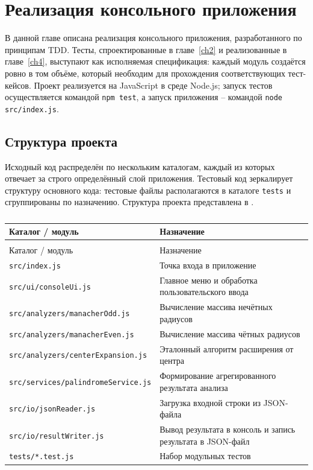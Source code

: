 \chapter{Реализация консольного приложения} \label{ch5}

В данной главе описана реализация консольного приложения, разработанного по принципам TDD.
Тесты, спроектированные в главе~\ref{ch2} и реализованные в главе~\ref{ch4}, выступают как исполняемая спецификация: каждый модуль создаётся ровно в том объёме, который необходим для прохождения соответствующих тест-кейсов.
Проект реализуется на JavaScript в среде Node.js; запуск тестов осуществляется командой \texttt{npm test}, а запуск приложения -- командой \texttt{node src/index.js}.

\section{Структура проекта} \label{ch5:sec1}

Исходный код распределён по нескольким каталогам, каждый из которых отвечает за строго определённый слой приложения.
Тестовый код зеркалирует структуру основного кода: тестовые файлы располагаются в каталоге \texttt{tests} и сгруппированы по назначению.
Структура проекта представлена в .

\noindent
\begingroup
\centering
\small
\begin{longtable}[c]{|p{7.8cm}|p{8.2cm}|}
    \caption{Структура проекта}
    \label{tab:packages}
    \\
    \hline
    Каталог / модуль & Назначение \\ \hline
    \endfirsthead
    \captionsetup{format=tablenocaption,labelformat=continued}
    \caption[]{}\\
    \hline
    Каталог / модуль & Назначение \\ \hline
    \endhead
    \hline
    \endfoot
    \hline
    \endlastfoot
    \texttt{src/index.js} & Точка входа в приложение \\ \hline
    \texttt{src/ui/consoleUi.js} & Главное меню и обработка пользовательского ввода \\ \hline
    \texttt{src/analyzers/manacherOdd.js} & Вычисление массива нечётных радиусов \\ \hline
    \texttt{src/analyzers/manacherEven.js} & Вычисление массива чётных радиусов \\ \hline
    \texttt{src/analyzers/centerExpansion.js} & Эталонный алгоритм расширения от центра \\ \hline
    \texttt{src/services/palindromeService.js} & Формирование агрегированного результата анализа \\ \hline
    \texttt{src/io/jsonReader.js} & Загрузка входной строки из JSON-файла \\ \hline
    \texttt{src/io/resultWriter.js} & Вывод результата в консоль и запись результата в JSON-файл \\ \hline
    \texttt{tests/*.test.js} & Набор модульных тестов \\ \hline
\end{longtable}
\normalsize
\endgroup

